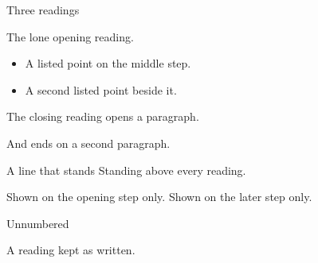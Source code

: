 \documentclass[aspectratio=169]{beamer}
\begin{document}
\begin{frame}{Three readings}
\begin{overprint}
 The lone opening reading.
\begin{itemize}
\item A listed point on the middle step.
\item A second listed point beside it.
\end{itemize}
The closing reading opens a paragraph.

And ends on a second paragraph.
\end{overprint}
\end{frame}

\begin{frame}{A line that stands}
Standing above every reading.
\begin{overprint}
 Shown on the opening step only.
 Shown on the later step only.
\end{overprint}
\end{frame}

\begin{frame}{Unnumbered}
\begin{overprint}
\onslide A reading kept as written.
\end{overprint}
\end{frame}
\end{document}

